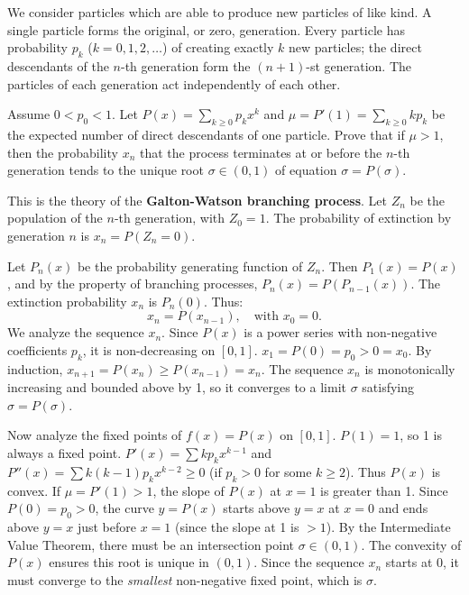 \begin{exercise}
\label{applied:2015:8}
We consider particles which are able to produce new particles of like kind. A single particle forms the original, or zero, generation. Every particle has probability $p_{k}$ ($k=0,1,2,\dots$) of creating exactly $k$ new particles; the direct descendants of the $n$-th generation form the $(n+1)$-st generation. The particles of each generation act independently of each other.

Assume $0<p_{0}<1$. Let $P(x)=\sum_{k\geq 0}p_{k}x^{k}$ and $\mu=P'(1)=\sum_{k\geq 0}kp_{k}$ be the expected number of direct descendants of one particle. Prove that if $\mu>1$, then the probability $x_{n}$ that the process terminates at or before the $n$-th generation tends to the unique root $\sigma\in(0,1)$ of equation $\sigma=P(\sigma)$.
\end{exercise}

\begin{solution}
This is the theory of the \textbf{Galton-Watson branching process}. Let $Z_n$ be the population of the $n$-th generation, with $Z_0=1$. The probability of extinction by generation $n$ is $x_n = P(Z_n = 0)$.

Let $P_n(x)$ be the probability generating function of $Z_n$. Then $P_1(x) = P(x)$, and by the property of branching processes, $P_n(x) = P(P_{n-1}(x))$. The extinction probability $x_n$ is $P_n(0)$. Thus:
\[
x_n = P(x_{n-1}), \quad \text{with } x_0 = 0.
\]
We analyze the sequence $x_n$. Since $P(x)$ is a power series with non-negative coefficients $p_k$, it is non-decreasing on $[0,1]$.
$x_1 = P(0) = p_0 > 0 = x_0$. By induction, $x_{n+1} = P(x_n) \geq P(x_{n-1}) = x_n$.
The sequence $x_n$ is monotonically increasing and bounded above by 1, so it converges to a limit $\sigma$ satisfying $\sigma = P(\sigma)$.

Now analyze the fixed points of $f(x) = P(x)$ on $[0,1]$.
$P(1) = 1$, so 1 is always a fixed point.
$P'(x) = \sum k p_k x^{k-1}$ and $P''(x) = \sum k(k-1) p_k x^{k-2} \geq 0$ (if $p_k > 0$ for some $k \geq 2$).
Thus $P(x)$ is convex. If $\mu = P'(1) > 1$, the slope of $P(x)$ at $x=1$ is greater than 1.
Since $P(0) = p_0 > 0$, the curve $y=P(x)$ starts above $y=x$ at $x=0$ and ends above $y=x$ just before $x=1$ (since the slope at 1 is $>1$). By the Intermediate Value Theorem, there must be an intersection point $\sigma \in (0,1)$. The convexity of $P(x)$ ensures this root is unique in $(0,1)$. Since the sequence $x_n$ starts at 0, it must converge to the \textit{smallest} non-negative fixed point, which is $\sigma$.
\end{solution}

